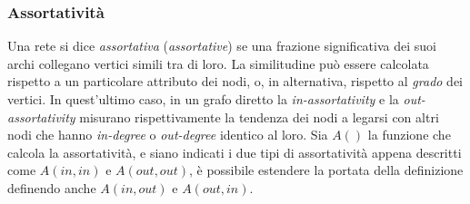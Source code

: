 \documentclass[a4paper,12pt]{article}
\begin{document}
\subsubsection{Assortatività}
Una rete si dice \textit{assortativa} (\textit{assortative}) \cite{newman} se 
una frazione significativa dei suoi archi collegano vertici simili tra di loro. La similitudine può essere calcolata rispetto a un particolare attributo dei nodi, o, in alternativa, rispetto al \textit{grado} dei vertici. In quest'ultimo caso, in un grafo diretto \cite{assor} la \textit{in-assortativity} e la \textit{out-assortativity} misurano rispettivamente la tendenza dei nodi a legarsi con altri nodi che hanno \textit{in-degree} o \textit{out-degree} identico al loro. Sia $A()$ la funzione che calcola la assortatività, e siano indicati i due tipi di assortatività appena descritti come $A(in,in)$ e $A(out,out)$, è possibile estendere la portata della definizione definendo anche $A(in,out)$ e $A(out,in)$.
\end{document}
